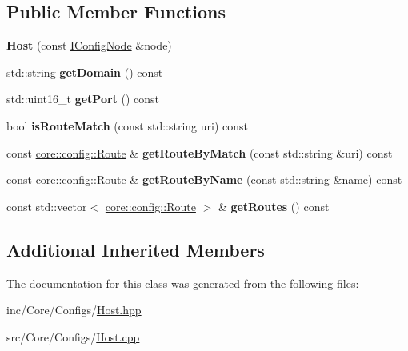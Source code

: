 \subsection*{Public Member Functions}
\begin{DoxyCompactItemize}
\item 
\mbox{\label{classcore_1_1config_1_1Host_ab5608aa941f9801c303be4a4f6a92bd9}} 
{\bfseries Host} (const \hyperlink{classIConfigNode}{I\+Config\+Node} \&node)
\item 
\mbox{\label{classcore_1_1config_1_1Host_a1ce4d7d648965b68baaec038d729659c}} 
std\+::string {\bfseries get\+Domain} () const
\item 
\mbox{\label{classcore_1_1config_1_1Host_a3de75f501fae836e3640880b3edc5ee2}} 
std\+::uint16\+\_\+t {\bfseries get\+Port} () const
\item 
\mbox{\label{classcore_1_1config_1_1Host_afcfb19681ef50cb4f2fe2a94ae52976a}} 
bool {\bfseries is\+Route\+Match} (const std\+::string uri) const
\item 
\mbox{\label{classcore_1_1config_1_1Host_ab7c1b67a94d1c6a760a7b22b32824a40}} 
const \hyperlink{classcore_1_1config_1_1Route}{core\+::config\+::\+Route} \& {\bfseries get\+Route\+By\+Match} (const std\+::string \&uri) const
\item 
\mbox{\label{classcore_1_1config_1_1Host_a78f5c42a8c63d04a96fafba8cf073e92}} 
const \hyperlink{classcore_1_1config_1_1Route}{core\+::config\+::\+Route} \& {\bfseries get\+Route\+By\+Name} (const std\+::string \&name) const
\item 
\mbox{\label{classcore_1_1config_1_1Host_ae76f1a298a1266206bb4727ad95ca549}} 
const std\+::vector$<$ \hyperlink{classcore_1_1config_1_1Route}{core\+::config\+::\+Route} $>$ \& {\bfseries get\+Routes} () const
\end{DoxyCompactItemize}
\subsection*{Additional Inherited Members}


The documentation for this class was generated from the following files\+:\begin{DoxyCompactItemize}
\item 
inc/\+Core/\+Configs/\hyperlink{Host_8hpp}{Host.\+hpp}\item 
src/\+Core/\+Configs/\hyperlink{Host_8cpp}{Host.\+cpp}\end{DoxyCompactItemize}

